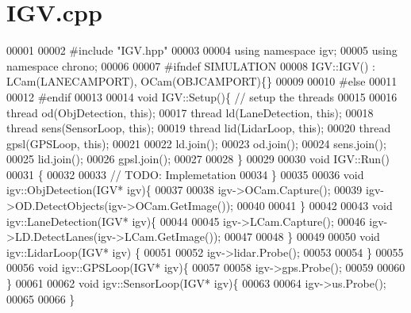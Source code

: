 \hypertarget{IGV_8cpp_source}{}\section{I\+G\+V.\+cpp}
\label{IGV_8cpp_source}

\begin{DoxyCode}
00001 
00002 \textcolor{preprocessor}{#}\textcolor{preprocessor}{include} \textcolor{preprocessor}{"IGV.hpp"}
00003 
00004 \textcolor{keyword}{using} \textcolor{keyword}{namespace} igv;
00005 \textcolor{keyword}{using} \textcolor{keyword}{namespace} chrono;
00006 
00007 \textcolor{preprocessor}{#}\textcolor{preprocessor}{ifndef} \textcolor{preprocessor}{SIMULATION}
00008 IGV::IGV() : LCam(LANECAMPORT), OCam(OBJCAMPORT)\{\}
00009 
00010 \textcolor{preprocessor}{#}\textcolor{preprocessor}{else}
00011 
00012 \textcolor{preprocessor}{#}\textcolor{preprocessor}{endif}
00013 
00014 \textcolor{keywordtype}{void} IGV::Setup()\{ \textcolor{comment}{// setup the threads }
00015 
00016   thread od(ObjDetection, \textcolor{keyword}{this});
00017   thread ld(LaneDetection, \textcolor{keyword}{this});
00018   thread sens(SensorLoop, \textcolor{keyword}{this});
00019   thread lid(LidarLoop, \textcolor{keyword}{this});
00020   thread gpsl(GPSLoop, \textcolor{keyword}{this});
00021 
00022   ld.join();
00023   od.join();
00024   sens.join();
00025   lid.join();
00026   gpsl.join();
00027 
00028 \}
00029 
00030 \textcolor{keywordtype}{void} IGV::Run()
00031 \{
00032 
00033   \textcolor{comment}{// TODO: Implemetation}
00034 \}
00035 
00036 \textcolor{keywordtype}{void} igv::ObjDetection(IGV* igv)\{
00037 
00038   igv->OCam.Capture();
00039   igv->OD.DetectObjects(igv->OCam.GetImage());
00040 
00041 \}
00042 
00043 \textcolor{keywordtype}{void} igv::LaneDetection(IGV* igv)\{
00044 
00045   igv->LCam.Capture();
00046   igv->LD.DetectLanes(igv->LCam.GetImage());
00047 
00048 \}
00049 
00050 \textcolor{keywordtype}{void} igv::LidarLoop(IGV* igv) \{
00051 
00052   igv->lidar.Probe();
00053 
00054 \}
00055 
00056 \textcolor{keywordtype}{void} igv::GPSLoop(IGV* igv)\{
00057 
00058   igv->gps.Probe();
00059 
00060 \}
00061 
00062 \textcolor{keywordtype}{void} igv::SensorLoop(IGV* igv)\{
00063 
00064   igv->us.Probe();
00065 
00066 \}
\end{DoxyCode}
